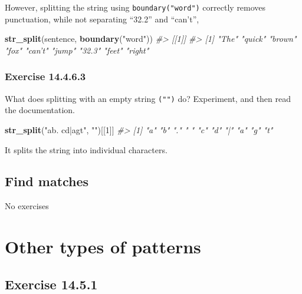 \documentclass[]{book}
\newenvironment{Shaded}{\begin{snugshade}}{\end{snugshade}}
\newcommand{\CommentTok}[1]{\textcolor[rgb]{0.56,0.35,0.01}{\textit{#1}}}
\newcommand{\DecValTok}[1]{\textcolor[rgb]{0.00,0.00,0.81}{#1}}
\newcommand{\KeywordTok}[1]{\textcolor[rgb]{0.13,0.29,0.53}{\textbf{#1}}}
\newcommand{\NormalTok}[1]{#1}
\newcommand{\StringTok}[1]{\textcolor[rgb]{0.31,0.60,0.02}{#1}}
\theoremstyle{plain}
\theoremstyle{remark}
\begin{document}
However, splitting the string using \texttt{boundary("word")} correctly
removes punctuation, while not separating ``32.2'' and ``can't'',

\begin{Shaded}
\begin{Highlighting}[]
\KeywordTok{str_split}\NormalTok{(sentence, }\KeywordTok{boundary}\NormalTok{(}\StringTok{"word"}\NormalTok{))}
\CommentTok{#> [[1]]}
\CommentTok{#> [1] "The"   "quick" "brown" "fox"   "can’t" "jump"  "32.3"  "feet"  "right"}
\end{Highlighting}
\end{Shaded}

\hypertarget{exercise-14.4.6.3}{%
\subsubsection*{\texorpdfstring{Exercise
{14.4.6.3}}{Exercise 14.4.6.3}}\label{exercise-14.4.6.3}}

What does splitting with an empty string \texttt{("")} do? Experiment,
and then read the documentation.

\begin{Shaded}
\begin{Highlighting}[]
\KeywordTok{str_split}\NormalTok{(}\StringTok{"ab. cd|agt"}\NormalTok{, }\StringTok{""}\NormalTok{)[[}\DecValTok{1}\NormalTok{]]}
\CommentTok{#>  [1] "a" "b" "." " " "c" "d" "|" "a" "g" "t"}
\end{Highlighting}
\end{Shaded}

It splits the string into individual characters.

\hypertarget{find-matches}{%
\subsection{Find matches}\label{find-matches}}

No exercises

\hypertarget{other-types-of-patterns}{%
\section{Other types of patterns}\label{other-types-of-patterns}}

\hypertarget{exercise-14.5.1}{%
\subsection*{\texorpdfstring{Exercise
{14.5.1}}{Exercise 14.5.1}}\label{exercise-14.5.1}}
\end{document}
